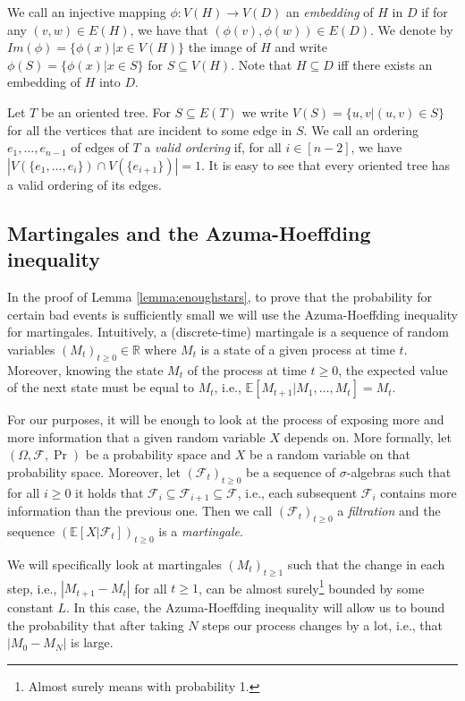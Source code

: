 \documentclass[10pt, a4paper]{article}
\theoremstyle{remark}
\newcommand*{\E}{\ensuremath{\mathbb{E}}}
\begin{document}
We call an injective mapping $\phi: V(H) \to V(D)$ an \emph{embedding} of $H$ in $D$ if for any $(v, w) \in E(H)$, we have that $(\phi(v), \phi(w)) \in E(D)$.
We denote by $Im(\phi) = \{ \phi(x) | x \in V(H)\}$ the image of $H$ and write $\phi(S) = \{\phi(x) | x \in S \}$ for $S \subseteq V(H)$.
Note that $H \subseteq D$ iff there exists an embedding of $H$ into $D$.

Let $T$ be an oriented tree.
For $S \subseteq E(T)$ we write $V(S) = \{u,v | (u,v) \in S \}$ for all the vertices that are incident to some edge in $S$.
We call an ordering $e_1,\dots, e_{n-1}$ of edges of $T$ a \emph{valid ordering} if, for all $i \in [n-2]$, we have $|V(\{e_1, \dots, e_i\}) \cap V(\{e_{i+1}\})| = 1$.
It is easy to see that every oriented tree has a valid ordering of its edges.

\subsection*{Martingales and the Azuma-Hoeffding inequality}
In the proof of Lemma \ref{lemma:enoughstars}, to prove that the probability for certain bad events is sufficiently small we will use the Azuma-Hoeffding inequality for martingales. 
Intuitively, a (discrete-time) martingale is a sequence of random variables $(M_t)_{t \geq 0} \in \mathbb{R}$ where $M_t$ is a state of a given process at time $t$.
Moreover, knowing the state $M_t$ of the process at time $t \geq 0$, the expected value of the next state must be equal to $M_t$, i.e., $\E[M_{t+1} | M_1, \dots, M_t] = M_t$.

For our purposes, it will be enough to look at the process of exposing more and more information that a given random variable $X$ depends on.
More formally, let $(\Omega, \mathcal{F}, \Pr)$ be a probability space and $X$ be a random variable on that probability space.
Moreover, let $(\mathcal{F}_t)_{t \geq 0} $ be a sequence of $\sigma$-algebras such that for all $i \geq 0$ it holds that $\mathcal{F}_i \subseteq \mathcal{F}_{i+1} \subseteq \mathcal{F}$, i.e., each subsequent $\mathcal{F}_i$ contains more information than the previous one.
Then we call $(\mathcal{F}_t)_{t \geq 0}$ a \emph{filtration} and the sequence $(\E[X | \mathcal{F}_t])_{t \geq 0}$ is a \emph{martingale}.

We will specifically look at martingales $(M_t)_{t \geq 1}$ such that the change in each step, i.e., $|M_{t+1} - M_{t}|$ for all $t\geq 1$, can be almost surely\footnote{Almost surely means with probability 1.} bounded by some constant $L$.
In this case, the Azuma-Hoeffding inequality will allow us to bound the probability that after taking $N$ steps our process changes by a lot, i.e., that $|M_0 - M_N|$ is large.
\end{document}
